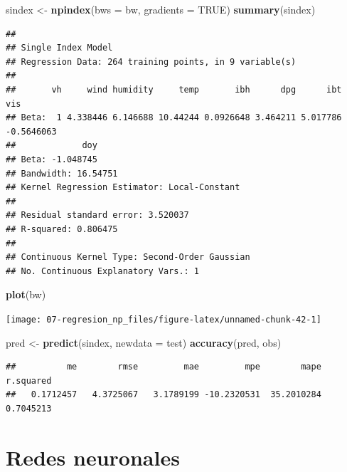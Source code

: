 \documentclass[
]{book}
\newenvironment{Shaded}{\begin{snugshade}}{\end{snugshade}}
\newcommand{\DataTypeTok}[1]{\textcolor[rgb]{0.13,0.29,0.53}{#1}}
\newcommand{\KeywordTok}[1]{\textcolor[rgb]{0.13,0.29,0.53}{\textbf{#1}}}
\newcommand{\NormalTok}[1]{#1}
\newcommand{\OtherTok}[1]{\textcolor[rgb]{0.56,0.35,0.01}{#1}}
\newcommand{\StringTok}[1]{\textcolor[rgb]{0.31,0.60,0.02}{#1}}
\theoremstyle{break}
\theoremstyle{definition}
\theoremstyle{definition}
\theoremstyle{definition}
\theoremstyle{remark}
\begin{document}
\begin{Shaded}
\begin{Highlighting}[]
\NormalTok{sindex <-}\StringTok{ }\KeywordTok{npindex}\NormalTok{(}\DataTypeTok{bws =}\NormalTok{ bw, }\DataTypeTok{gradients =} \OtherTok{TRUE}\NormalTok{)}
\KeywordTok{summary}\NormalTok{(sindex)}
\end{Highlighting}
\end{Shaded}

\begin{verbatim}
## 
## Single Index Model
## Regression Data: 264 training points, in 9 variable(s)
## 
##       vh     wind humidity     temp       ibh      dpg      ibt        vis
## Beta:  1 4.338446 6.146688 10.44244 0.0926648 3.464211 5.017786 -0.5646063
##             doy
## Beta: -1.048745
## Bandwidth: 16.54751
## Kernel Regression Estimator: Local-Constant
## 
## Residual standard error: 3.520037
## R-squared: 0.806475
## 
## Continuous Kernel Type: Second-Order Gaussian
## No. Continuous Explanatory Vars.: 1
\end{verbatim}

\begin{Shaded}
\begin{Highlighting}[]
\KeywordTok{plot}\NormalTok{(bw)}
\end{Highlighting}
\end{Shaded}

\begin{center}\texttt{[image: 07-regresion\_np\_files/figure-latex/unnamed-chunk-42-1]} \end{center}

\begin{Shaded}
\begin{Highlighting}[]
\NormalTok{pred <-}\StringTok{ }\KeywordTok{predict}\NormalTok{(sindex, }\DataTypeTok{newdata =}\NormalTok{ test)}
\KeywordTok{accuracy}\NormalTok{(pred, obs)}
\end{Highlighting}
\end{Shaded}

\begin{verbatim}
##          me        rmse         mae         mpe        mape   r.squared 
##   0.1712457   4.3725067   3.1789199 -10.2320531  35.2010284   0.7045213
\end{verbatim}

\hypertarget{neural-nets}{%
\chapter{Redes neuronales}\label{neural-nets}}
\end{document}
